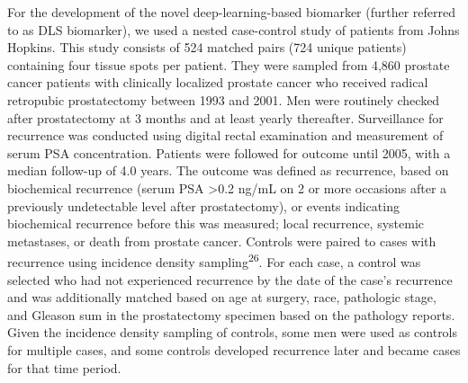 \documentclass[
  12pt,
  a5,margin=2cmpaper,
]{article}
\begin{document}
For the development of the novel deep-learning-based biomarker (further
referred to as DLS biomarker), we used a nested case-control study of
patients from Johns Hopkins. This study consists of 524 matched pairs
(724 unique patients) containing four tissue spots per patient. They
were sampled from 4,860 prostate cancer patients with clinically
localized prostate cancer who received radical retropubic prostatectomy
between 1993 and 2001. Men were routinely checked after prostatectomy at
3 months and at least yearly thereafter. Surveillance for recurrence was
conducted using digital rectal examination and measurement of serum PSA
concentration. Patients were followed for outcome until 2005, with a
median follow-up of 4.0 years. The outcome was defined as recurrence,
based on biochemical recurrence (serum PSA \textgreater0.2 ng/mL on 2 or
more occasions after a previously undetectable level after
prostatectomy), or events indicating biochemical recurrence before this
was measured; local recurrence, systemic metastases, or death from
prostate cancer. Controls were paired to cases with recurrence using
incidence density sampling\textsuperscript{26}. For each case, a control
was selected who had not experienced recurrence by the date of the
case's recurrence and was additionally matched based on age at surgery,
race, pathologic stage, and Gleason sum in the prostatectomy specimen
based on the pathology reports. Given the incidence density sampling of
controls, some men were used as controls for multiple cases, and some
controls developed recurrence later and became cases for that time
period.
\end{document}
